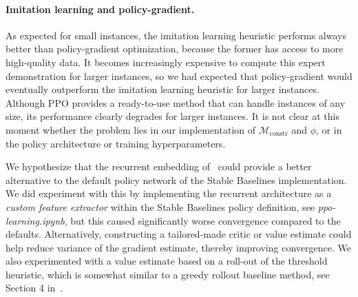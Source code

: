\documentclass{report}
\theoremstyle{definition}
\theoremstyle{plain}
\begin{document}
\paragraph{Imitation learning and policy-gradient.}
As expected for small instances, the imitation learning heuristic performs
always better than policy-gradient optimization, because the former has access
to more high-quality data.
%
It becomes increasingly expensive to compute this expert demonstration for
larger instances, so we had expected that policy-gradient would eventually
outperform the imitation learning heuristic for larger instances.
%
Although PPO provides a ready-to-use method that can handle instances of any
size, its performance clearly degrades for larger instances.
%
It is not clear at this moment whether the problem lies in our implementation of
$\mathcal{M}_\textrm{constr}$ and $\phi$, or in the policy architecture or
training hyperparameters.

We hypothesize that the recurrent embedding of~ could
provide a better alternative to the default policy network of the Stable
Baselines implementation.
%
We did experiment with this by implementing the recurrent architecture as a
\emph{custom feature extractor} within the Stable Baselines policy definition,
see \emph{ppo-learning.ipynb}, but this caused significantly worse convergence
compared to the defaults.
%
Alternatively, constructing a tailored-made critic or value estimate could help
reduce variance of the gradient estimate, thereby improving convergence.
%
We also experimented with a value estimate based on a roll-out of the threshold
heuristic, which is somewhat similar to a greedy rollout baseline method, see
Section 4 in~\cite{koolAttentionLearnSolve2019}.

\begin{table}
  \centering
  
  \captionsetup{width=0.8\linewidth}
  \caption{%
    \emph{Performance comparison of heuristics with respect to integer programming baseline.}
    Each row corresponds to a problem distribution, specified by the number of
    vehicles per route $n_r$ and the type of arrival distribution 
    $F_\mathrm{train}$ that is used on all routes.
    To evaluate the integer programming baseline, we sample and solve 50 instances to optimality, with a fixed time limit of one minute per instance.
    For each distribution, we indicate the average objective opt and the average solver time $T$.
    For each heuristic, we list the average objective obj for the 50 test instances, the average optimality gap with respect to the optimal MILP solutions and the total training time $T_\mathrm{train}$.
    The lowest gap is highlighted in each row.
    The evaluation time of heuristics is not listed, because it is less than one 
    second in all cases.}\label{tab:heuristics-results}
% 
\end{table}
\end{document}
